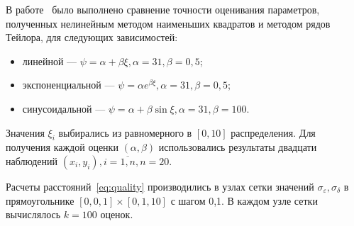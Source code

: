 В работе~\cite{budny15} было выполнено сравнение точности оценивания параметров,
полученных нелинейным методом наименьших квадратов и методом рядов Тейлора,
для следующих зависимостей:
\begin{itemize}
\item линейной --- \( \psi = \alpha + \beta \xi, \alpha = 31, \beta = 0{,}5 \);
\item экспоненциальной --- \( \psi = \alpha e^{\beta \xi}, \alpha = 31, \beta = 0{,}5 \);
\item синусоидальной --- \( \psi = \alpha + \beta \sin \xi, \alpha = 31, \beta = 100 \).
\end{itemize}

Значения \( \xi_i \) выбирались из равномерного в \( [0, 10] \) распределения.
Для получения каждой оценки \( ( \alpha, \beta ) \) использовались результаты
двадцати наблюдений \( ( x_i, y_i ), i = \overline{1, n}, n = 20 \).

Расчеты расстояний~\eqref{eq:quality} производились в узлах сетки значений
\( \sigma_{\varepsilon}, \sigma_{\delta} \) в прямоугольнике
\( [0, 0{,}1] \times [0{,}1, 10] \) с шагом 0{,}1.
В каждом узле сетки вычислялось \( k = 100 \) оценок.
